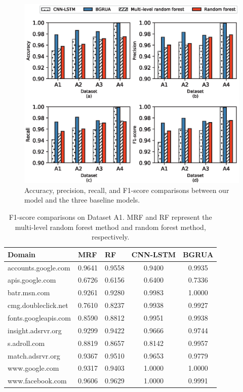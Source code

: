\documentclass[preprint,12pt]{elsarticle}
\begin{document}
\begin{figure}[hp]
\centering
\includegraphics[width=\textwidth]{aprf.eps}
\caption{Accuracy, precision, recall, and F1-score comparisons between our model and the three baseline models.}\label{fig5}
\end{figure}





\begin{table}[]
\caption{F1-score comparisons on Dataset A1. MRF and RF represent the multi-level random forest method and random forest method, respectively.}
\centering
\label{tab6}
\begin{tabular}{lllcc}
\hline
\textbf{Domain}      & \textbf{MRF} & \textbf{RF} & \textbf{CNN-LSTM} & \textbf{BGRUA} \\ \hline
accounts.google.com  & 0.9641 & 0.9558 & 0.9400   & 0.9935 \\
apis.google.com      & 0.6726 & 0.6156 & 0.6400   & 0.7336 \\
batr.msn.com         & 0.9261 & 0.9280 & 0.9983   & 1.0000 \\
cmg.doubleclick.net  & 0.7610 & 0.8237 & 0.9938   & 0.9927 \\
fonts.googleapis.com & 0.8590 & 0.8812 & 0.9951   & 0.9938 \\
insight.adsrvr.org   & 0.9299 & 0.9422 & 0.9666   & 0.9744 \\
s.adroll.com         & 0.8819 & 0.8657 & 0.8142   & 0.9957 \\
match.adsrvr.org     & 0.9367 & 0.9510 & 0.9653   & 0.9779 \\
www.google.com       & 0.9317 & 0.9403 & 1.0000   & 1.0000 \\
www.facebook.com     & 0.9606 & 0.9629 & 1.0000   & 0.9991 \\ \hline
\end{tabular}
\end{table}
\end{document}
